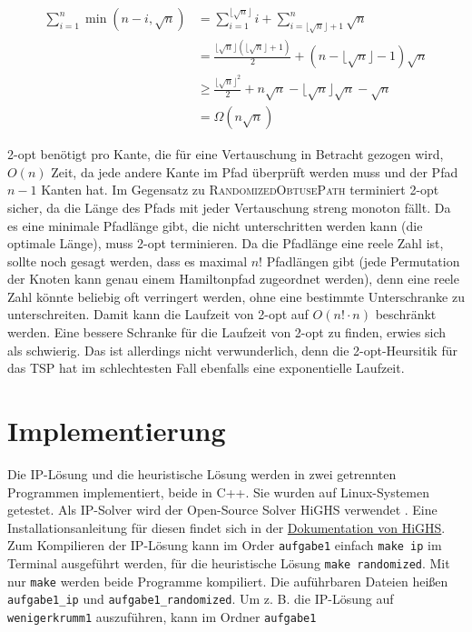 \documentclass[a4paper, 10pt, ngerman]{article}
\begin{document}
\begin{align*}
    \sum_{i = 1}^{n} \min(n - i, \sqrt n) & = 
    \sum_{i = 1}^{\lfloor \sqrt n \rfloor} i +
    \sum_{i = \lfloor \sqrt n \rfloor + 1}^n \sqrt n \\
    & = \frac {\lfloor \sqrt n \rfloor (\lfloor \sqrt n \rfloor + 1)} 2 +
    (n - \lfloor \sqrt n \rfloor - 1) \sqrt n \\
    & \ge \frac {\lfloor \sqrt n \rfloor ^2} 2  + n \sqrt n - \lfloor \sqrt n \rfloor \sqrt n - \sqrt n \\
    & = \Omega(n \sqrt n)
\end{align*}

2-opt benötigt pro Kante, die für eine Vertauschung in Betracht gezogen wird, $O(n)$ Zeit, da jede andere Kante im Pfad überprüft werden muss und der Pfad $n - 1$ Kanten hat. Im Gegensatz zu \textsc{RandomizedObtusePath} terminiert 2-opt sicher, da die Länge des Pfads mit jeder Vertauschung streng monoton fällt. Da es eine minimale Pfadlänge gibt, die nicht unterschritten werden kann (die optimale Länge), muss 2-opt terminieren. Da die Pfadlänge eine reele Zahl ist, sollte noch gesagt werden, dass es maximal $n!$ Pfadlängen gibt (jede Permutation der Knoten kann genau einem Hamiltonpfad zugeordnet werden), denn eine reele Zahl könnte beliebig oft verringert werden, ohne eine bestimmte Unterschranke zu unterschreiten. Damit kann die Laufzeit von 2-opt auf $O(n! \cdot n)$ beschränkt werden. Eine bessere Schranke für die Laufzeit von 2-opt zu finden, erwies sich als schwierig. Das ist allerdings nicht verwunderlich, denn die 2-opt-Heursitik für das TSP hat im schlechtesten Fall ebenfalls eine exponentielle Laufzeit.

\section{Implementierung}

Die IP-Lösung und die heuristische Lösung werden in zwei getrennten Programmen implementiert, beide in C++. Sie wurden auf Linux-Systemen getestet. Als IP-Solver wird der Open-Source Solver HiGHS verwendet \cite{highs}. Eine Installationsanleitung für diesen findet sich in der \href{https://ergo-code.github.io/HiGHS/dev/}{Dokumentation von HiGHS}. Zum Kompilieren der IP-Lösung kann im Order \verb|aufgabe1| einfach \verb|make ip| im Terminal ausgeführt werden, für die heuristische Lösung \verb|make randomized|. Mit nur \verb|make| werden beide Programme kompiliert. Die auführbaren Dateien heißen \verb|aufgabe1_ip| und \verb|aufgabe1_randomized|. Um z. B. die IP-Lösung auf \verb|wenigerkrumm1| auszuführen, kann im Ordner \verb|aufgabe1|
\end{document}
